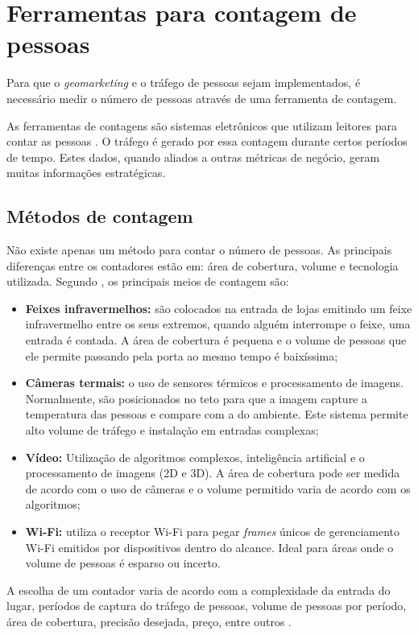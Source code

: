 \section{Ferramentas para contagem de pessoas}
Para que o \emph{geomarketing} e o tráfego de pessoas sejam implementados, é necessário medir o número
de pessoas através de uma ferramenta de contagem.

As ferramentas de contagens são sistemas eletrônicos que utilizam leitores para contar as pessoas
\cite{trafsysdef}. O tráfego é gerado por essa contagem durante
certos períodos de tempo. Estes dados, quando aliados a outras métricas de
negócio, geram muitas informações estratégicas.

\subsection{Métodos de contagem}
Não existe apenas um método para contar o número de pessoas. As principais
diferenças entre os contadores estão em: área de cobertura, volume e tecnologia
utilizada. Segundo , os principais meios de
contagem são:

\begin{itemize}
  \item \textbf{Feixes infravermelhos:} são colocados
na entrada de lojas emitindo um feixe infravermelho entre os seus extremos,
quando alguém interrompe o feixe, uma entrada é contada. A área de cobertura é
pequena e o volume de pessoas que ele permite passando pela porta ao mesmo
tempo é baixíssima;
  \item \textbf{Câmeras termais:} o uso de sensores térmicos e
processamento de imagens. Normalmente,
são posicionados no teto para que a imagem capture a temperatura das pessoas
e compare com a do ambiente. Este sistema permite alto volume de tráfego e instalação em entradas complexas;
  \item \textbf{Vídeo:} Utilização de algoritmos complexos, inteligência artificial
   e o processamento de imagens (2D e 3D). A área de cobertura
  pode ser medida de acordo com o uso de câmeras e o volume permitido varia de acordo com os algoritmos;
  \item \textbf{Wi-Fi:} utiliza o receptor Wi-Fi para pegar \emph{frames} únicos de gerenciamento Wi-Fi emitidos por dispositivos
  dentro do alcance. Ideal para áreas onde o volume de pessoas é esparso ou incerto.
\end{itemize}

A escolha de um contador varia de acordo com a complexidade da entrada do lugar, períodos de captura do tráfego de pessoas,
volume de pessoas por período, área de cobertura, precisão desejada, preço, entre outros \cite{trafsys} \cite{Axper2017}.

